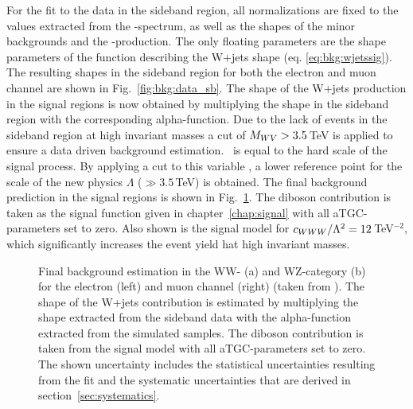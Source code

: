 \noindent For the fit to the data in the sideband region, all normalizations are fixed to the values extracted from the \Mpr -spectrum, as well as the shapes of the minor backgrounds and the \ttbar -production. The only floating parameters are the shape parameters of the function describing the W+jets shape (eq. \ref{eq:bkg:wjetssig}). The resulting shapes in the sideband region for both the electron and muon channel are shown in Fig.~\ref{fig:bkg:data_sb}. The shape of the W+jets production in the signal regions is now obtained by multiplying the shape in the sideband region with the corresponding alpha-function. Due to the lack of events in the sideband region at high invariant masses a cut of $M_{WV} > 3.5$\,TeV is applied to ensure a data driven background estimation. \MWV \ is equal to the hard scale of the signal process. By applying a cut to this variable , a lower reference point for the scale of the new physics $\Lambda$ ($\gg3.5$\,TeV) is obtained. The final background prediction in the signal regions is shown in Fig.~\ref{fig:bkg:mwv_final}. The diboson contribution is taken as the signal function given in chapter~\ref{chap:signal} with all aTGC-parameters set to zero. Also shown is the signal model for $c_{WWW}/\Lambda^2 = 12$\,TeV$^{-2}$, which significantly increases the event yield hat high invariant masses.
 \begin{figure}
	\centering
	\caption[Final background estimation in the WW- and WZ-category for the electron and muon channel]{Final background estimation in the WW- (a) and WZ-category (b) for the electron (left) and muon channel (right) (taken from \cite{PAS}). The shape of the W+jets contribution is estimated by multiplying the shape extracted from the sideband data with the alpha-function extracted from the simulated samples. The diboson contribution is taken from the signal model with all aTGC-parameters set to zero. The shown uncertainty includes the statistical uncertainties resulting from the fit and the systematic uncertainties that are derived in section~\ref{sec:systematics}.}
	\label{fig:bkg:mwv_final}
\end{figure}


